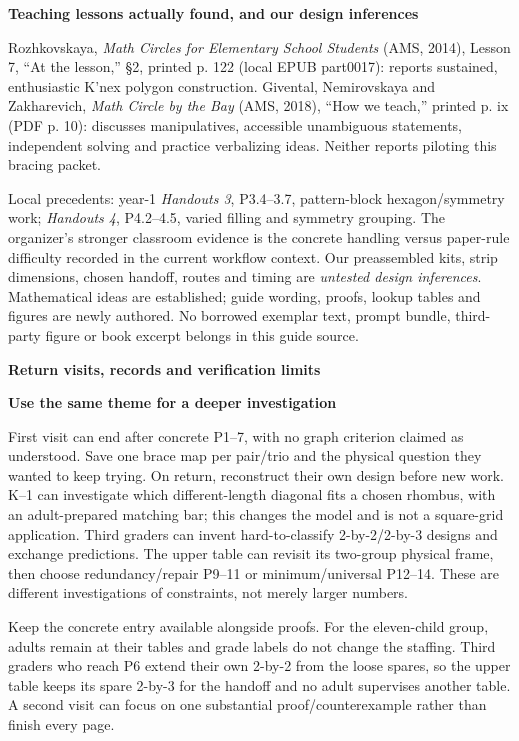 \documentclass[letterpaper,11pt]{article}
\newcommand{\titleline}[1]{\par{\large\bfseries #1}\par}
\newcommand{\sub}[1]{\par\textbf{#1}\par}
\begin{document}
\sub{Teaching lessons actually found, and our design inferences}
Rozhkovskaya, \emph{Math Circles for Elementary School Students} (AMS, 2014), Lesson 7, ``At the lesson,'' \S2, printed p. 122 (local EPUB part0017): reports sustained, enthusiastic K'nex polygon construction. Givental, Nemirovskaya and Zakharevich, \emph{Math Circle by the Bay} (AMS, 2018), ``How we teach,'' printed p. ix (PDF p. 10): discusses manipulatives, accessible unambiguous statements, independent solving and practice verbalizing ideas. Neither reports piloting this bracing packet.

Local precedents: year-1 \emph{Handouts 3}, P3.4--3.7, pattern-block hexagon/symmetry work; \emph{Handouts 4}, P4.2--4.5, varied filling and symmetry grouping. The organizer's stronger classroom evidence is the concrete handling versus paper-rule difficulty recorded in the current workflow context. Our preassembled kits, strip dimensions, chosen handoff, routes and timing are \emph{untested design inferences}. Mathematical ideas are established; guide wording, proofs, lookup tables and figures are newly authored. No borrowed exemplar text, prompt bundle, third-party figure or book excerpt belongs in this guide source.

\newpage
\titleline{Return visits, records and verification limits}
\sub{Use the same theme for a deeper investigation}
First visit can end after concrete P1--7, with no graph criterion claimed as understood. Save one brace map per pair/trio and the physical question they wanted to keep trying. On return, reconstruct their own design before new work. K--1 can investigate which different-length diagonal fits a chosen rhombus, with an adult-prepared matching bar; this changes the model and is not a square-grid application. Third graders can invent hard-to-classify 2-by-2/2-by-3 designs and exchange predictions. The upper table can revisit its two-group physical frame, then choose redundancy/repair P9--11 or minimum/universal P12--14. These are different investigations of constraints, not merely larger numbers.

Keep the concrete entry available alongside proofs. For the eleven-child group, adults remain at their tables and grade labels do not change the staffing. Third graders who reach P6 extend their own 2-by-2 from the loose spares, so the upper table keeps its spare 2-by-3 for the handoff and no adult supervises another table. A second visit can focus on one substantial proof/counterexample rather than finish every page.
\end{document}
